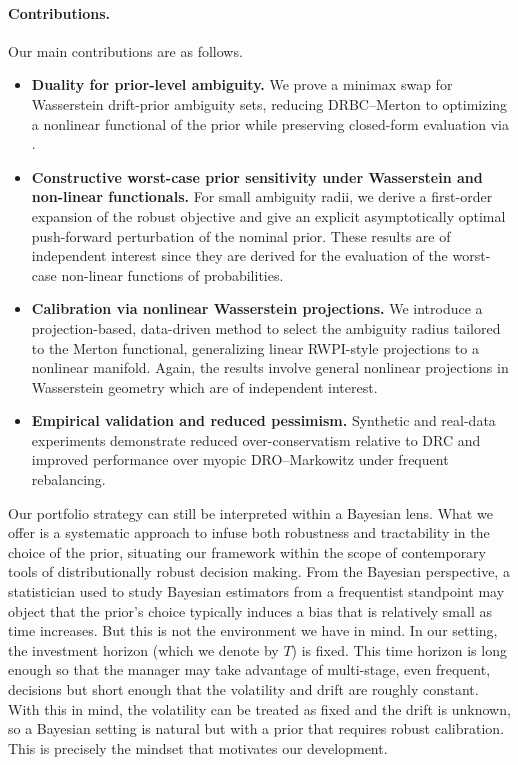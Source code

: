 \documentclass[11pt]{article}
\theoremstyle{definition}
\begin{document}
\paragraph{Contributions.} Our main contributions are as follows.
\begin{itemize}
  \item \textbf{Duality for prior-level ambiguity.} We prove a minimax swap for Wasserstein drift-prior ambiguity sets,  %
  reducing DRBC--Merton to optimizing a nonlinear functional of the prior while preserving closed-form evaluation via \cite{KZ98}.
  \item \textbf{Constructive worst-case prior sensitivity under Wasserstein and non-linear functionals.} For small ambiguity radii, we derive a first-order expansion of the robust objective and give an explicit asymptotically optimal push-forward perturbation of the nominal prior. These results are of independent interest since they are derived for the evaluation of the worst-case non-linear functions of probabilities.
  \item \textbf{Calibration via nonlinear Wasserstein projections.} We introduce a projection-based, data-driven method to select the ambiguity radius tailored to the Merton functional, generalizing linear RWPI-style projections to a nonlinear manifold. Again, the results involve general nonlinear projections in Wasserstein geometry which are of independent interest.
  \item \textbf{Empirical validation and reduced pessimism.} Synthetic and real-data experiments demonstrate reduced over-conservatism relative to DRC and improved performance over myopic DRO--Markowitz under frequent rebalancing.
\end{itemize}

{Our portfolio strategy can still be interpreted within a Bayesian lens. What we offer is a systematic approach to infuse both robustness and tractability in the choice of the prior, situating our framework within the scope of contemporary tools of distributionally robust decision making. From the Bayesian perspective, a statistician used to study Bayesian estimators from a frequentist standpoint may object that the prior's choice typically induces a bias that is relatively small as time increases. But this is not the environment we have in mind. In our setting, the investment horizon (which we denote by $T$) is fixed. This time horizon is long enough so that the manager may take advantage of multi-stage, even frequent, decisions but short enough that the volatility and drift are roughly constant. With this in mind, the volatility can be treated as fixed and the drift is unknown, so a Bayesian setting is natural but with a prior that requires robust calibration. This is precisely the mindset that motivates our development.}
\end{document}
